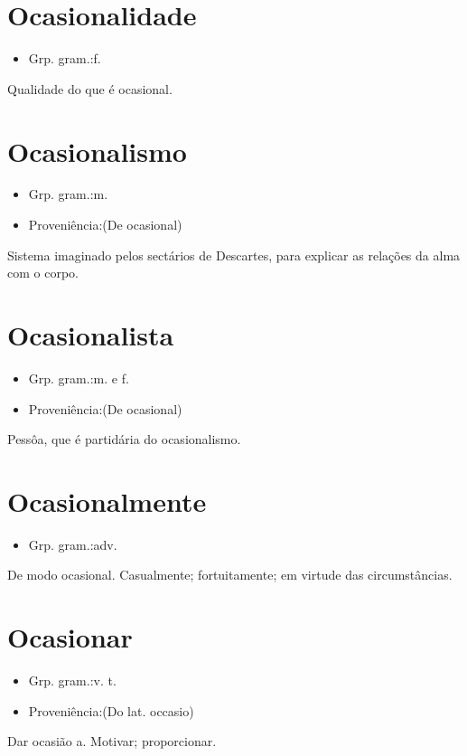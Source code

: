 \section{Ocasionalidade}
\begin{itemize}
\item {Grp. gram.:f.}
\end{itemize}
Qualidade do que é ocasional.
\section{Ocasionalismo}
\begin{itemize}
\item {Grp. gram.:m.}
\end{itemize}
\begin{itemize}
\item {Proveniência:(De \textunderscore ocasional\textunderscore )}
\end{itemize}
Sistema imaginado pelos sectários de Descartes, para explicar as relações da alma com o corpo.
\section{Ocasionalista}
\begin{itemize}
\item {Grp. gram.:m.  e  f.}
\end{itemize}
\begin{itemize}
\item {Proveniência:(De \textunderscore ocasional\textunderscore )}
\end{itemize}
Pessôa, que é partidária do ocasionalismo.
\section{Ocasionalmente}
\begin{itemize}
\item {Grp. gram.:adv.}
\end{itemize}
De modo ocasional.
Casualmente; fortuitamente; em virtude das circumstâncias.
\section{Ocasionar}
\begin{itemize}
\item {Grp. gram.:v. t.}
\end{itemize}
\begin{itemize}
\item {Proveniência:(Do lat. \textunderscore occasio\textunderscore )}
\end{itemize}
Dar ocasião a.
Motivar; proporcionar.
